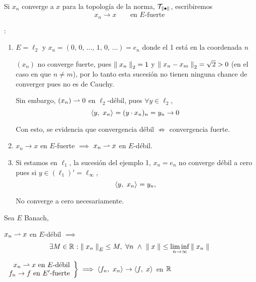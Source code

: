 Si $x_n$ converge a $x$ para la topología de la norma, $\TAU[\norm{\bullet}]$, escribiremos 
\begin{equation}
    x_n \to x \qquad \text{en $E$-fuerte}
\end{equation}

\begin{ex}:\\
\begin{enumerate}
    \item $E = \ell_{2}$ y $x_n = (0,\, 0,\, \ldots,\, 1,\, 0,\, \ldots) = e_n$ donde el 1 está en la coordenada $n$
    
    $(x_n)$ no converge fuerte, pues $\norm[2]{x_n} = 1$ y $\norm[2]{x_n - x_m} = \sqrt{2} > 0$ (en el caso en que $n \not = m$), por lo tanto esta sucesión no tienen ninguna chance de converger pues no es de Cauchy.
    
    Sin embargo, $(x_n) \convdebil 0$ en $\ell_2$-débil, pues $\forall y \in \ell_2$,
    \begin{equation}
        \prodint[]{y}{x_n} = (y \cdot x_n)_n = y_n \to 0
    \end{equation}
    
    Con esto, se evidencia que convergencia débil $\nRightarrow$ convergencia fuerte.  
    
    \item $x_n \to x$ en $E$-fuerte $\implies$ $x_n \convdebil x$ en $E$-débil.
    
    \item Si estamos en $\ell_1$, la sucesión del ejemplo 1, $x_n = e_n$ no converge débil a cero pues si $y \in (\ell_1)' = \ell_{\infty}$,
    \begin{equation}
        \prodint[]{y}{x_n} = y_n,
    \end{equation}
    
    No converge a cero necesariamente.
\end{enumerate}
\end{ex}

\begin{prop}\label{prop:prop-3-conv-debil-acot}
Sea $E$ Banach,
\begin{ienumerate}
    \item $x_n \convdebil x$ en $E$-débil $\implies$ $$\exists M \in \rr:
        \norm[E]{x_n} \leq M,\ \forall n \ \wedge \ \norm[]{x} \leq \liminf_{n \to \infty} \norm[]{x_n} $$
        
    \item $
    \left.\begin{array}{r}
        \text{$x_n \convdebil x$ en $E$-débil} \\
        \text{$f_n \to f$ en $E'$-fuerte}
    \end{array}\right\} \implies \prodint[]{f_n}{x_n} \to \prodint[]{f}{x}$ en $\rr$
\end{ienumerate}
\end{prop}